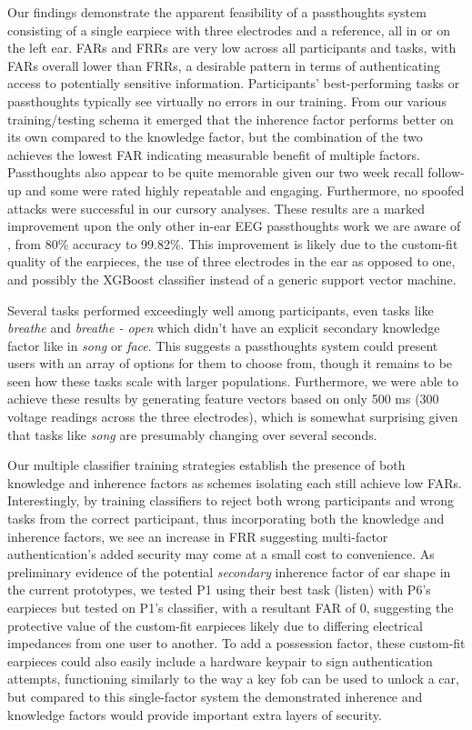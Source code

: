 \documentclass{sigchi}
\begin{document}
Our findings demonstrate the apparent feasibility of a passthoughts system consisting of a single earpiece with three electrodes and a reference, all in or on the left ear. FARs and FRRs are very low across all participants and tasks, with FARs overall lower than FRRs, a desirable pattern in terms of authenticating access to potentially sensitive information. Participants' best-performing tasks or passthoughts typically see virtually no errors in our training. From our various training/testing schema it emerged that the inherence factor performs better on its own compared to the knowledge factor, but the combination of the two achieves the lowest FAR indicating measurable benefit of multiple factors. Passthoughts also appear to be quite memorable given our two week recall follow-up and some were rated highly repeatable and engaging. Furthermore, no spoofed attacks were successful in our cursory analyses. These results are a marked improvement upon the only other in-ear EEG passthoughts work we are aware of \cite{curran2016passthoughts}, from 80\% accuracy to 99.82\%. This improvement is likely due to the custom-fit quality of the earpieces, the use of three electrodes in the ear as opposed to one, and possibly the XGBoost classifier instead of a generic support vector machine.

Several tasks performed exceedingly well among participants, even tasks like \textit{breathe} and \textit{breathe - open} which didn't have an explicit secondary knowledge factor like in \textit{song} or \textit{face}. This suggests a passthoughts system could present users with an array of options for them to choose from, though it remains to be seen how these tasks scale with larger populations. Furthermore, we were able to achieve these results by generating feature vectors based on only 500 ms (300 voltage readings across the three electrodes), which is somewhat surprising given that tasks like \textit{song} are presumably changing over several seconds.

Our multiple classifier training strategies establish the presence of both knowledge and inherence factors as schemes isolating each still achieve low FARs. Interestingly, by training classifiers to reject both wrong participants and wrong tasks from the correct participant, thus incorporating both the knowledge and inherence factors, we see an increase in FRR suggesting multi-factor authentication's added security may come at a small cost to convenience. As preliminary evidence of the potential \textit{secondary} inherence factor of ear shape in the current prototypes, we tested P1 using their best task (listen) with P6's earpieces but tested on P1's classifier, with a resultant FAR of 0, suggesting the protective value of the custom-fit earpieces likely due to differing electrical impedances from one user to another. To add a possession factor, these custom-fit earpieces could also easily include a hardware keypair to sign authentication attempts, functioning similarly to the way a key fob can be used to unlock a car, but compared to this single-factor system the demonstrated inherence and knowledge factors would provide important extra layers of security.
\end{document}

